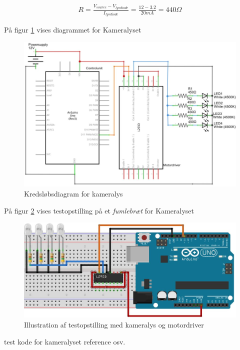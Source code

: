 \begin{align}
R=\frac{V_{source}-V_{lysdiode}}{I_{lysdiode}}=\frac{12-3.2}{20mA}=440\Omega
\label{eq:modstand}
\end{align} 

På figur \ref{fig:LEDdiagram} vises diagrammet for Kameralyset
 
 \begin{figure}[H]
	\centering
	\includegraphics[width=1\textwidth]{billeder/Hardware/diagrammer/LEDdiagram.JPG}
	\caption{Kredsløbsdiagram for kameralys}
	\label{fig:LEDdiagram}
\end{figure} 

På figur \ref{fig:LEDbreadboard} vises testopstilling på et \textit{fumlebræt} for Kameralyset

\begin{figure}[H]
	\centering
	\includegraphics[width=1\textwidth]{billeder/Hardware/diagrammer/LEDbreadboard.JPG}
	\caption{Illustration af testopstilling med kameralys og motordriver}
	\label{fig:LEDbreadboard}
\end{figure}

 test kode for kameralyset reference osv.
 
